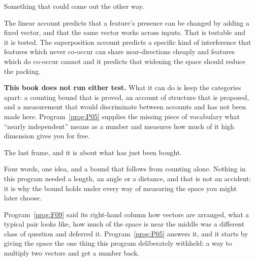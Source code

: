 \begin{fr}
\begin{ansblock}
Something that could come out the other way.
\end{ansblock}

The linear account predicts that a feature's presence can be changed by adding
a fixed vector, and that the same vector works across inputs. That is testable
and it is tested. The superposition account predicts a specific kind of
interference \dash{} that features which never co-occur can share
near-directions cheaply and features which do co-occur cannot \dash{} and it
predicts that widening the space should reduce the packing.

\begin{rigourbox}
\textbf{This book does not run either test.} What it can do is keep the
categories apart: a counting bound that is proved, an account of structure that
is proposed, and a measurement that would discriminate between accounts and has
not been made here. Program~\ref{prog:P05} supplies the missing piece of
vocabulary \dash{} what \enquote{nearly independent} means as a number \dash{}
and measures how much of it high dimension gives you for free.
\end{rigourbox}
\end{fr}

\begin{fr}
The last frame, and it is about what has just been bought.

Four words, one idea, and a bound that follows from counting alone. Nothing in
this program needed a length, an angle or a distance, and that is not an
accident: it is why the bound holds under every way of measuring the space you
might later choose.

Program~\ref{prog:F09} said its right-hand column \dash{} how vectors are
arranged, what a typical pair looks like, how much of the space is near the
middle \dash{} was a different class of question and deferred it.
Program~\ref{prog:P05} answers it, and it starts by giving the space the one
thing this program deliberately withheld: a way to multiply two vectors and get
a number back.
\end{fr}


